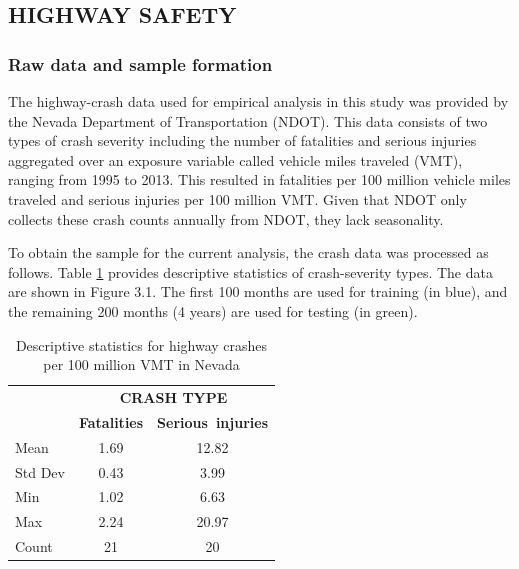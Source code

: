 \documentclass[letterpaper]{article}
\begin{document}
\subsection{HIGHWAY SAFETY}

\subsubsection{Raw data and sample formation}

The highway-crash data used for empirical analysis in this study was provided by the Nevada Department of Transportation (NDOT). This data consists of two types of crash severity including the number of fatalities and serious injuries aggregated over an exposure variable called vehicle miles traveled (VMT), ranging from 1995 to 2013. This resulted in fatalities per 100 million vehicle miles traveled and serious injuries per 100 million VMT. Given that NDOT only collects these crash counts annually from NDOT, they lack seasonality.

To obtain the sample for the current analysis, the crash data was processed as follows. Table \ref{tab:descriptive-stats-fatalities} provides descriptive statistics of crash-severity types. The data are shown in Figure 3.1. The first 100 months are used for training (in blue), and the remaining 200 months (4 years) are used for testing (in green). 

\begin{table}[h]
\caption{Descriptive statistics for highway crashes per 100 million VMT in Nevada}
\label{tab:descriptive-stats-fatalities}
\begin{center}
\begin{tabular}{l@{\qquad}cc}
  \toprule
  \multirow{2}{*}{\raisebox{-\heavyrulewidth}{\bf STATISTIC}} & \multicolumn{2}{c}{\bf CRASH TYPE} \\
  \cmidrule{2-3}
  & {\bf Fatalities} & {\bf Serious~injuries} \\
  \midrule
  Mean & 1.69 & 12.82  \\
  Std Dev & 0.43 & 3.99  \\
  Min & 1.02 & 6.63  \\
  Max & 2.24 & 20.97  \\
  Count & 21 & 20  \\
  \bottomrule
\end{tabular}
\end{center}
\end{table}
\end{document}
